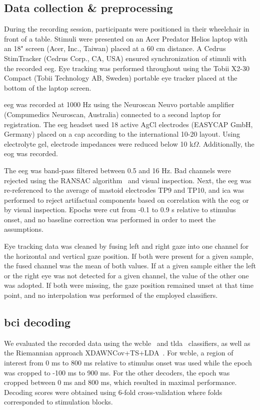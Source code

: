 \subsection{Data collection \& preprocessing}

During the recording session, participants were positioned in their wheelchair in front of a table.
Stimuli were presented on an Acer Predator Helios laptop with an 18" screen (Acer,
Inc., Taiwan) placed at a 60 cm distance.
A Cedrus StimTracker (Cedrus Corp., CA, USA) ensured synchronization of stimuli with the
recorded \ac{eeg}.
Eye tracking was performed throughout using the Tobii X2-30 Compact (Tobii
Technology AB, Sweden) portable eye tracker placed at the bottom of the laptop screen.

\Ac{eeg} was recorded at 1000 Hz using the Neuroscan Neuvo portable amplifier (Compumedics Neuroscan,
Australia) connected to a second laptop for registration.
The \ac{eeg} headset used 18 active AgCl electrodes (EASYCAP GmbH, Germany) placed on a cap
according to the international 10-20 layout.
Using electrolyte gel, electrode impedances were reduced below 10 k$\Omega$.
Additionally, the \ac{eog} was recorded.

The \ac{eeg} was band-pass filtered between 0.5 and 16 Hz.
Bad channels were rejected using the RANSAC algorithm~\cite{Fischler1981}
and visual inspection.
Next, the \ac{eeg} was re-referenced to the average of mastoid electrodes TP9
and TP10, and \ac{ica} was performed to reject artifactual components based on
correlation with the \ac{eog} or by visual inspection.
Epochs were cut from -0.1 to 0.9 s relative to stimulus onset, and no baseline
correction was performed in order to meet the assumptions.

Eye tracking data was cleaned by fusing left and right gaze into one channel
for the horizontal and vertical gaze position.
If both were present for a given sample, the fused channel was the mean of both
values.
If at a given sample either the left or the right eye was not detected for a
given channel, the value of the other one was adopted.
If both were missing, the gaze position remained unset at that time point, and no
interpolation was performed of the employed classifiers.

\subsection{\Acs{bci} decoding}

We evaluated the recorded data using the \ac{wcble}~\cite{VanDenKerchove2024}
and \ac{tlda}~\cite{Sosulski2022}
classifiers, as well as the Riemannian approach XDAWNCov+TS+LDA~\cite{Cecotti2017}.
For \ac{wcble}, a region of interest from 0 ms to 800 ms relative to stimulus
onset was used while the epoch was cropped to -100 ms to 900 ms. For the other
decoders, the epoch was cropped between 0 ms and 800 ms, which resulted in maximal
performance.
Decoding scores were obtained using 6-fold cross-validation where folds corresponded to
stimulation blocks.

